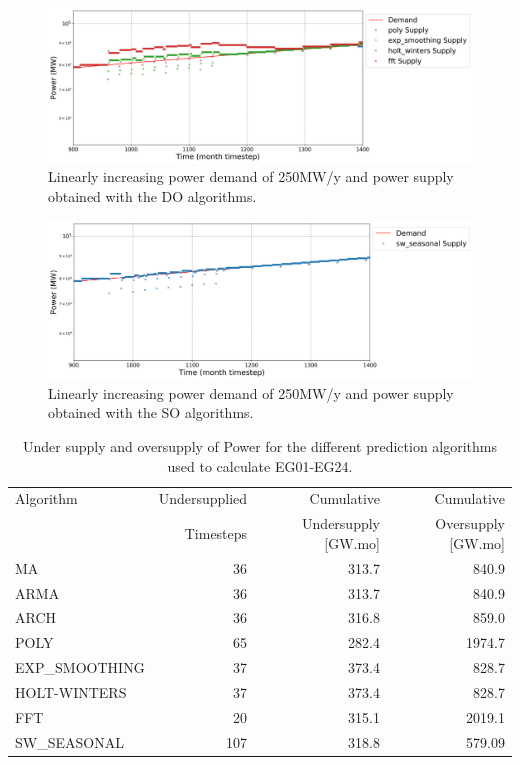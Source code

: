 \documentclass[11pt]{article}
\begin{document}
\begin{figure}[H]
	\centering
	\includegraphics[width=\textwidth]{24-figures/lin-24-power-buffer02.png} 
	\hfill
	\caption{Linearly increasing power demand of 250MW/y and power supply obtained with the DO algorithms.}
	\label{fig:24-lin-DO}
\end{figure}

\begin{figure}[H]
	\centering
	\includegraphics[width=\textwidth]{24-figures/lin-24-power-buffer03.png} 
	\hfill
	\caption{Linearly increasing power demand of 250MW/y and power supply obtained with the SO algorithms.}
	\label{fig:24-lin-SO}
\end{figure}

\begin{table}[H]
	\centering
	\caption{Under supply and oversupply of Power for the different prediction algorithms used to calculate EG01-EG24.}
	\label{tab:24-lin-power}
	\begin{tabularx}{\textwidth}{lRRR}
		\hline
		Algorithm & Undersupplied & Cumulative  & Cumulative \\
		& Timesteps     & Undersupply [GW.mo]  & Oversupply [GW.mo] \\ \hline
		MA        & 36 	& 313.7 & 840.9 \\ 
		ARMA      & 36 	& 313.7 & 840.9 \\ 
		ARCH      & 36 	& 316.8 & 859.0 \\ 
		POLY      &  65 & 282.4 & 1974.7 \\ 
		EXP\_SMOOTHING 	& 37 & 373.4 & 828.7 \\ 
		HOLT-WINTERS  	& 37 & 373.4 & 828.7 \\ 
		FFT       & 20	& 315.1	& 2019.1 \\ 
		SW\_SEASONAL    & 107 & 318.8 & 579.09 \\ \hline
	\end{tabularx}
\end{table}
\end{document}
